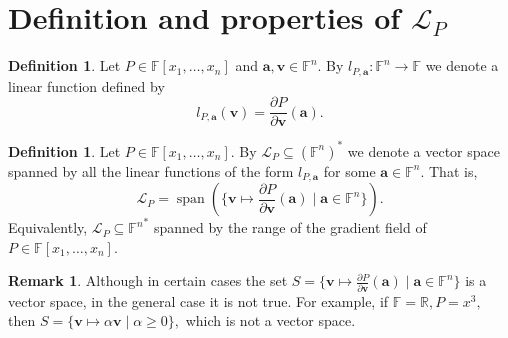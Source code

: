 \documentclass{elsarticle}
\DeclareMathOperator{\Span}{span}
\def\F{{\mathbb F}}
\theoremstyle{definition}
\newtheorem{definition}[theorem]{Definition}
\newtheorem{remark}[theorem]{Remark}
\numberwithin{equation}{section}
\begin{document}
\section{Definition and properties of $\mathcal L_P$}
\label{sec:linspace}



\begin{definition} Let $P \in \F[x_1,\ldots, x_n]$ and $\mathbf a, \mathbf v \in \F^n$. By $l_{P,\mathbf a} \colon \mathbb F^n \to \mathbb F$ we denote a linear function defined by
\[
l_{P, \mathbf a}(\mathbf v) = \frac{\partial P}{\partial \mathbf v}(\mathbf a).%
\] %
\end{definition}

\begin{definition}\label{def:LP}
Let $P \in \F[x_1,\ldots, x_n]$. By $\mathcal L_P \subseteq (\F^n)^*$ we denote a vector space spanned by all the linear functions of the form $l_{P, \mathbf a}$ for some $\mathbf a \in \F^n.$ That is,
\[
\mathcal L_P = \Span (\{\mathbf v \mapsto \frac{\partial P}{\partial \mathbf v}(\mathbf a) \mid \mathbf a \in \mathbb F^n\}).
\]
Equivalently, $\mathcal L_{P} \subseteq {\F^n}^*$ spanned by the range of the gradient field of $P \in \F[x_1,\ldots, x_n]$.
\end{definition}

\begin{remark}Although in certain cases the set $S = \{\mathbf v \mapsto \frac{\partial P}{\partial \mathbf v}(\mathbf a) \mid \mathbf a \in \mathbb F^n\}$ is a vector space, in the general case it is not true. For example, if $\F = \mathbb R, P = x^3,$ then $S = \{\mathbf v \mapsto \alpha \mathbf v \mid \alpha \ge 0\},$ which is not a vector space.
\end{remark}
\end{document}
